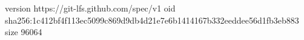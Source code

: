 version https://git-lfs.github.com/spec/v1
oid sha256:1c412bf4f113ec5099c869d9db4d21e7e6b1414167b332eeddee56d1fb3eb883
size 96064
